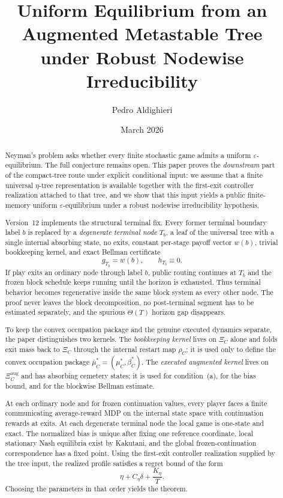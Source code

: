 \documentclass[12pt]{article}
\title{\textbf{Uniform Equilibrium from an Augmented Metastable Tree\\under Robust Nodewise Irreducibility}}
\author{Pedro Aldighieri}
\date{March 2026}
\theoremstyle{definition}
\newcommand{\eps}{\varepsilon}
\newcommand{\1}{\mathbf{1}}
\begin{document}
\maketitle



\begin{abstract}
Neyman's problem asks whether every finite stochastic game admits a uniform
$\eps$-equilibrium. The full conjecture remains open. This paper proves the
\emph{downstream} part of the compact-tree route under explicit conditional input:
we assume that a finite universal $\eta$-tree representation is available together
with the first-exit controller realization attached to that tree, and we show that
this input yields a public finite-memory uniform $\eps$-equilibrium under a robust
nodewise irreducibility hypothesis.

Version~12 implements the structural terminal fix. Every former terminal boundary
label $b$ is replaced by a \emph{degenerate terminal node} $T_b$, a leaf of the
universal tree with a single internal absorbing state, no exits, constant
per-stage payoff vector $w(b)$, trivial bookkeeping kernel, and exact Bellman
certificate
\[
g_{T_b}=w(b),
\qquad
h_{T_b}\equiv 0.
\]
If play exits an ordinary node through label $b$, public routing continues at
$T_b$ and the frozen block schedule keeps running until the horizon is exhausted.
Thus terminal behavior becomes regenerative inside the same block system as every
other node. The proof never leaves the block decomposition, no post-terminal
segment has to be estimated separately, and the spurious $\Theta(T)$ horizon gap
disappears.

To keep the convex occupation package and the genuine executed dynamics separate,
the paper distinguishes two kernels. The \emph{bookkeeping kernel} lives on
$\Xi_C$ alone and folds exit mass back to $\Xi_C$ through the internal restart map
$\rho_C$; it is used only to define the convex occupation package
$\bar\mu_C^*=(\mu_C^*,\beta_C^*)$. The \emph{executed augmented kernel} lives on
$\Xi_C^{\mathrm{aug}}$ and has absorbing cemetery states; it is used for
condition~\textnormal{(a)}, for the bias bound, and for the blockwise Bellman
estimate.

At each ordinary node and for frozen continuation values, every player faces a
finite communicating average-reward MDP on the internal state space with
continuation rewards at exits. At each degenerate terminal node the local game is
one-state and exact. The normalized bias is unique after fixing one reference
coordinate, local stationary Nash equilibria exist by Kakutani, and the global
frozen-continuation correspondence has a fixed point. Using the first-exit
controller realization supplied by the tree input, the realized profile satisfies a
regret bound of the form
\[
\eta + C_\eta\delta + \frac{K_\eta}{T}.
\]
Choosing the parameters in that order yields the theorem.
\end{abstract}
\end{document}
